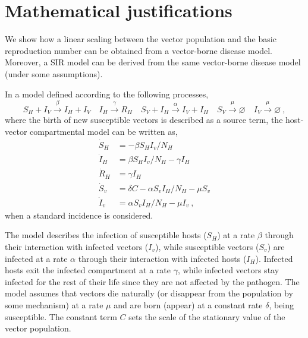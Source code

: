 \section{Mathematical justifications}\label{app:SIR_justifications}

We show how a linear scaling between the vector population and the basic
reproduction number can be obtained from a vector-borne disease model.
Moreover, a SIR model can be derived from the same vector-borne disease model
(under some assumptions).

In a model defined according to the following processes,
\begin{equation}\label{eq:scheme_infection}
    S_H+I_V \stackrel{\beta}{\rightarrow} I_H + I_V \quad I_H
    \stackrel{\gamma}{\rightarrow} R_H \quad S_V+I_H
    \stackrel{\alpha}{\rightarrow}
    I_V+I_H \quad S_V \stackrel{\mu}{\rightarrow} \varnothing \quad I_V
    \stackrel{\mu}{\rightarrow} \varnothing
    \ ,
\end{equation}
where the birth of new susceptible vectors is described as a source term,
the host-vector compartmental model can be written as,
\begin{equation}\label{eq:SIR_v}
    \begin{aligned}
        \dot{S}_H & =-\beta S_H I_v / N_H                     \\
        \dot{I}_H & =\beta S_H I_v / N_H - \gamma I_H         \\
        \dot{R}_H & =\gamma I_H                               \\
        \dot{S}_v & = \delta C-\alpha S_v I_H / N_H - \mu S_v \\
        \dot{I}_v & =\alpha S_v I_H / N_H - \mu I_v \ ,
    \end{aligned}
\end{equation}
when a standard incidence \cite{MartchevaBook} is considered.

The model describes the infection of susceptible hosts ($S_H$) at a rate
$\beta$ through their interaction with infected vectors ($I_v$), while
susceptible vectors ($S_v$) are infected at a rate $\alpha$ through their
interaction with infected hosts ($I_H$). Infected hosts exit the infected
compartment at a rate $\gamma$, while infected vectors stay infected for the
rest of their life since they are not affected by the pathogen. The model
assumes that vectors die naturally (or disappear from the population by some
mechanism) at a rate $\mu$ and are born (appear) at a constant rate $\delta$,
being susceptible. The constant term $C$ sets the scale of the stationary value
of the vector population.

